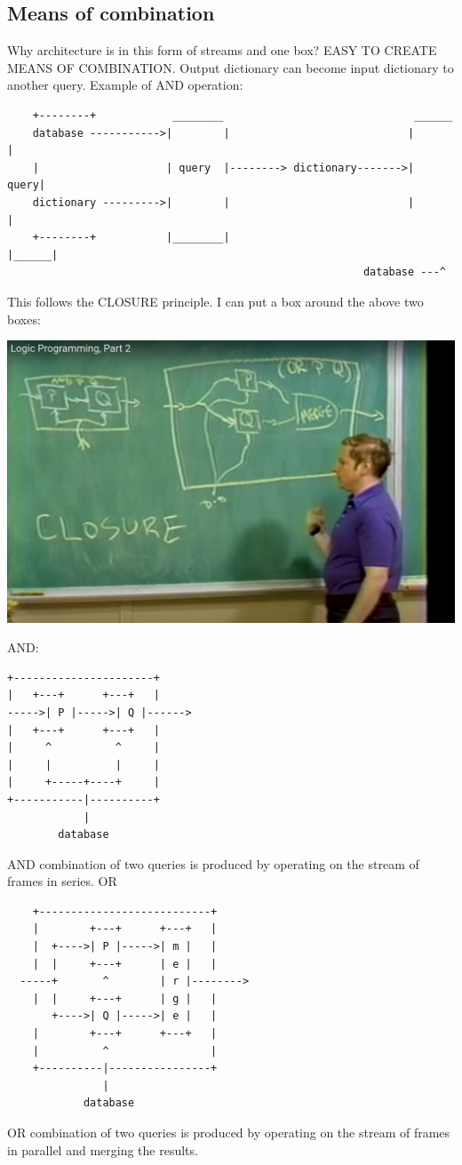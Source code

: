 \documentclass[a4paper,twoside]{article}
\numberwithin{equation}{section}
\begin{document}
\subsection{Means of combination}
Why architecture is in this form of streams and one box?
EASY TO CREATE MEANS OF COMBINATION. Output dictionary can become input dictionary to another query.
Example of AND operation:
\begin{lstlisting}
    +--------+            ________                              ______
    database ----------->|        |                            |      |
    |                    | query  |--------> dictionary------->| query|
    dictionary --------->|        |                            |      |
    +--------+           |________|                            |______|
                                                        database ---^
\end{lstlisting}
This follows the CLOSURE principle. I can put a box around the above two boxes:
\begin{center}
    \includegraphics[scale = 0.3]{assets/query_means_combination.png}
\end{center}
AND:
\begin{lstlisting}
+----------------------+
|   +---+      +---+   |
----->| P |----->| Q |------>
|   +---+      +---+   |
|     ^          ^     |
|     |          |     |
|     +-----+----+     |
+-----------|----------+
            |
        database
\end{lstlisting}
AND combination of two queries is produced by operating on the stream of frames in series.\newline
OR
\begin{lstlisting}
    +---------------------------+
    |        +---+      +---+   |
    |  +---->| P |----->| m |   |
    |  |     +---+      | e |   |
  -----+       ^        | r |-------->
    |  |     +---+      | g |   |
       +---->| Q |----->| e |   |
    |        +---+      +---+   |
    |          ^                |
    +----------|----------------+
               |
            database
\end{lstlisting}
OR  combination of two queries is produced by operating on the stream of frames in
parallel and merging the results.
\end{document}
